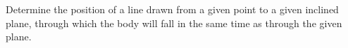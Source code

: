 Determine the position of a line drawn from 
a given point to a given inclined plane,
through which the body will fall in the 
same time as through the given plane.
